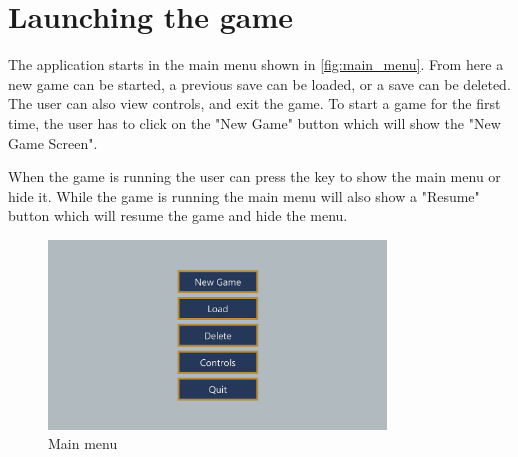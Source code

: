 \section{Launching the game}
The application starts in the main menu shown in \autoref{fig:main_menu}.
From here a new game can be started, a previous save can be loaded, or a save can be deleted.
The user can also view controls, and exit the game.
To start a game for the first time, the user has to click on the "New Game" button which will show the "New Game Screen".

When the game is running the user can press the \keys{\escwin} key to show the main menu or hide it.
While the game is running the main menu will also show a "Resume" button which will resume the game and hide the menu.

\begin{figure}[h]
    \centering
    \includegraphics[width=0.8\textwidth]{chapters/user_manual/resources/main-menu.png}
    \caption{Main menu}
    \label{fig:main_menu}
\end{figure}